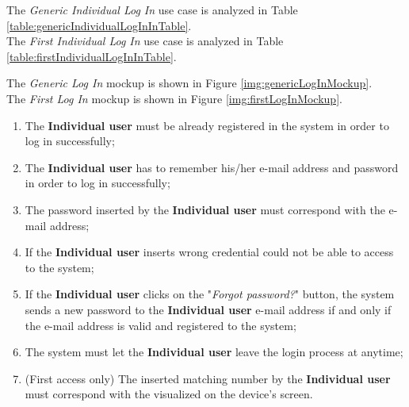 The \textit{Generic Individual Log In} use case is analyzed in Table \ref{table:genericIndividualLogInInTable}.\\
The \textit{First Individual Log In} use case is analyzed in Table \ref{table:firstIndividualLogInInTable}.

The \textit{Generic Log In} mockup is shown in Figure \ref{img:genericLogInMockup}. \\
The \textit{First Log In} mockup is shown in Figure \ref{img:firstLogInMockup}.

\begin{enumerate}
  \item The \textbf{Individual user} must be already registered in the system in order to log in successfully;
  \item The \textbf{Individual user} has to remember his/her e-mail address and password in order to log in successfully;
  \item The password inserted by the \textbf{Individual user} must correspond with the e-mail address;
  \item If the \textbf{Individual user} inserts wrong credential could not be able to access to the system;
  \item If the \textbf{Individual user} clicks on the "\textit{Forgot password?}" button, the system sends a new password to the \textbf{Individual user} e-mail address if and only if the e-mail address is valid and registered to the system;
  \item The system must let the \textbf{Individual user} leave the login process at anytime;
  \item (First access only) The inserted matching number by the \textbf{Individual user} must correspond with the visualized on the device's screen.
\end{enumerate}

